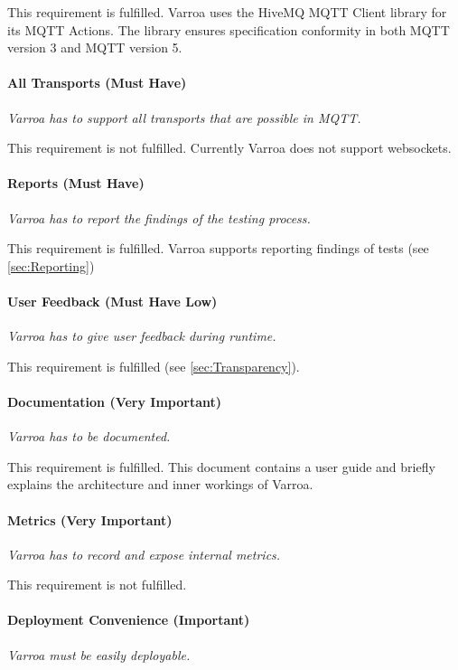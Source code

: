 This requirement is fulfilled.
Varroa uses the HiveMQ MQTT Client library for its MQTT Actions.
The library ensures specification conformity in both MQTT version 3 and MQTT version 5.

\paragraph{All Transports (Must Have)}
\emph{Varroa has to support all transports that are possible in MQTT.}

This requirement is not fulfilled.
Currently Varroa does not support websockets.

\paragraph{Reports (Must Have)}
\emph{Varroa has to report the findings of the testing process.}

This requirement is fulfilled.
Varroa supports reporting findings of tests (see \ref{sec:Reporting})

\paragraph{User Feedback (Must Have Low)}
\emph{Varroa has to give user feedback during runtime.}

This requirement is fulfilled (see \ref{sec:Transparency}).

\paragraph{Documentation (Very Important)}
\emph{Varroa has to be documented. }

This requirement is fulfilled.
This document contains a user guide and briefly explains the architecture and inner workings of Varroa.

\paragraph{Metrics (Very Important)}
\emph{Varroa has to record and expose internal metrics.}

This requirement is not fulfilled.

\paragraph{Deployment Convenience (Important)}
\emph{Varroa must be easily deployable.}

